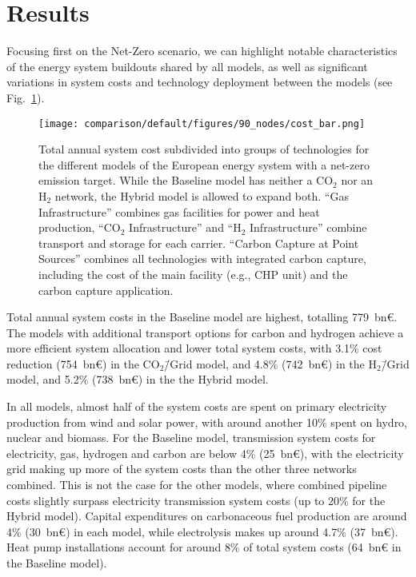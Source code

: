 \documentclass[twocolumn]{article}
\newcommand{\COtwo}{CO$_2$}
\newcommand{\Htwo}{H$_2$}
\newcommand{\modBase}{Baseline model}
\newcommand{\modCO}{CO$_2$\=/Grid model}
\newcommand{\modH}{H$_2$\=/Grid model}
\newcommand{\modHybrid}{Hybrid model}
\newcommand{\baselinemodel}{Baseline model}
\newcommand{\hybridmodel}{Hybrid model}
\begin{document}
\section{Results}
\label{sec:results}


Focusing first on the Net-Zero scenario, we can highlight notable characteristics of the energy system buildouts shared by all models, as well as significant variations in system costs and technology deployment between the models (see Fig.~\ref{fig:cost_bar}).

\begin{figure}[ht!]
    \centering
    \texttt{[image: comparison/default/figures/90\_nodes/cost\_bar.png]}
    \caption[short]{Total annual system cost subdivided into groups of technologies for the different models of the European energy system with a net-zero emission target. While the \modBase{} has neither a \COtwo{} nor an \Htwo{} network, the \modHybrid{} is allowed to expand both. ``Gas Infrastructure'' combines gas facilities for power and heat production, ``\COtwo{} Infrastructure'' and ``\Htwo{} Infrastructure'' combine transport and storage for each carrier. ``Carbon Capture at Point Sources'' combines all technologies with integrated carbon capture, including the cost of the main facility (e.g., CHP unit) and the carbon capture application.}
    \label{fig:cost_bar}
\end{figure}

Total annual system costs in the \modBase{} are highest, totalling \label{}779~bn€. The models with additional transport options for carbon and hydrogen achieve a more efficient system allocation and lower total system costs, with \label{}3.1\% cost reduction (\label{}754~bn€) in the \modCO{}, and \label{}4.8\% (\label{}742~bn€) in the \modH{}, and \label{}5.2\% (\label{}738~bn€) in the the \modHybrid{}.

In all models, almost half of the system costs are spent on primary electricity production from wind and solar power, with around another \label{}10\% spent on hydro, nuclear and biomass. For the \baselinemodel, transmission system costs for electricity, gas, hydrogen and carbon are below \label{}4\% (\label{}25~bn€), with the electricity grid making up more of the system costs than the other three networks combined. This is not the case for the other models, where combined pipeline costs slightly surpass electricity transmission system costs (up to 20\% for the \hybridmodel). Capital expenditures on carbonaceous fuel production are around \label{}4\% (\label{}30~bn€) in each model, while electrolysis makes up around \label{}4.7\% (\label{}37~bn€). Heat pump installations account for around \label{}8\% of total system costs (64~bn€ in the \baselinemodel).
\end{document}
